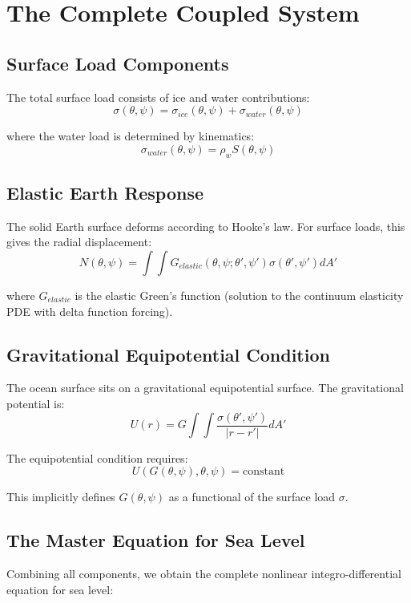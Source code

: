 \documentclass{article}
\begin{document}
\section{The Complete Coupled System}

\subsection{Surface Load Components}
The total surface load consists of ice and water contributions:
\begin{equation}
\sigma(\theta,\psi) = \sigma_{ice}(\theta,\psi) + \sigma_{water}(\theta,\psi)
\end{equation}

where the water load is determined by kinematics:
\begin{equation}
\sigma_{water}(\theta,\psi) = \rho_w S(\theta,\psi)
\end{equation}

\subsection{Elastic Earth Response}
The solid Earth surface deforms according to Hooke's law. For surface loads, this gives the radial displacement:
\begin{equation}
N(\theta,\psi) = \int\int G_{elastic}(\theta,\psi; \theta',\psi') \sigma(\theta',\psi') dA'
\end{equation}

where $G_{elastic}$ is the elastic Green's function (solution to the continuum elasticity PDE with delta function forcing).

\subsection{Gravitational Equipotential Condition}
The ocean surface sits on a gravitational equipotential surface. The gravitational potential is:
\begin{equation}
U(r) = G \int\int \frac{\sigma(\theta',\psi')}{|r-r'|} dA'
\end{equation}

The equipotential condition requires:
\begin{equation}
U(G(\theta,\psi), \theta, \psi) = \text{constant}
\end{equation}

This implicitly defines $G(\theta,\psi)$ as a functional of the surface load $\sigma$.

\subsection{The Master Equation for Sea Level}
Combining all components, we obtain the complete nonlinear integro-differential equation for sea level:
\end{document}
